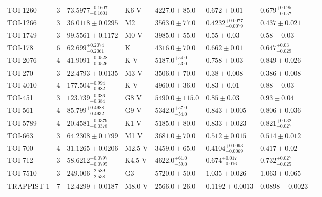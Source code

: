 \begin{tabular}{lrllllll}
TOI-1260 & 3 & $73.5977^{+0.1607}_{-0.1601}$ & K6 V & $4227.0 \pm 85.0$ & $0.672 \pm 0.01$ & $0.679^{+0.095}_{-0.057}$ & \cite{LAM_ET_AL_2023} \\
TOI-1266 & 3 & $36.0118 \pm 0.0295$ & M2 & $3563.0 \pm 77.0$ & $0.4232^{+0.0077}_{-0.0079}$ & $0.437 \pm 0.021$ & \cite{GREKLEK_MCKEON_ET_AL_2025} \\
TOI-1749 & 3 & $99.5561 \pm 0.1172$ & M0 V & $3985.0 \pm 55.0$ & $0.55 \pm 0.03$ & $0.58 \pm 0.03$ & \cite{FUKUI_ET_AL__2021} \\
TOI-178 & 6 & $62.699^{+0.2074}_{-0.2061}$ & K & $4316.0 \pm 70.0$ & $0.662 \pm 0.01$ & $0.647^{+0.03}_{-0.029}$ & \cite{LELEU_ET_AL__2024} \\
TOI-2076 & 4 & $41.9091^{+0.0528}_{-0.0526}$ & K V & $5187.0^{+54.0}_{-53.0}$ & $0.758 \pm 0.03$ & $0.849 \pm 0.026$ & \cite{KOKORI_ET_AL__2023} \\
TOI-270 & 3 & $22.4793 \pm 0.0135$ & M3 V & $3506.0 \pm 70.0$ & $0.38 \pm 0.008$ & $0.386 \pm 0.008$ & \cite{KAYE_ET_AL__2022} \\
TOI-4010 & 4 & $177.504^{+0.994}_{-0.982}$ & K V & $4960.0 \pm 36.0$ & $0.83 \pm 0.01$ & $0.88 \pm 0.03$ & \cite{KUNIMOTO_ET_AL__2023} \\
TOI-451 & 3 & $123.739^{+0.386}_{-0.384}$ & G8 V & $5490.0 \pm 115.0$ & $0.85 \pm 0.03$ & $0.93 \pm 0.04$ & \cite{BARRAGAN_ET_AL_2026} \\
TOI-561 & 4 & $85.799^{+0.4988}_{-0.4932}$ & G9 V & $5342.0^{+57.0}_{-54.0}$ & $0.843 \pm 0.005$ & $0.806 \pm 0.036$ & \cite{POLANSKI_ET_AL__2024} \\
TOI-5789 & 4 & $20.4581^{+0.0379}_{-0.0378}$ & K1 V & $5185.0 \pm 80.0$ & $0.833 \pm 0.023$ & $0.821^{+0.032}_{-0.027}$ & \cite{BONOMO_ET_AL_2026} \\
TOI-663 & 3 & $64.2308 \pm 0.1799$ & M1 V & $3681.0 \pm 70.0$ & $0.512 \pm 0.015$ & $0.514 \pm 0.012$ & \cite{COINTEPAS_ET_AL__2024} \\
TOI-700 & 4 & $31.1265 \pm 0.0206$ & M2.5 V & $3459.0 \pm 65.0$ & $0.4104^{+0.0093}_{-0.0069}$ & $0.417 \pm 0.02$ & \cite{GILBERT_ET_AL_2023} \\
TOI-712 & 3 & $58.6212^{+0.0797}_{-0.0795}$ & K4.5 V & $4622.0^{+61.0}_{-59.0}$ & $0.674^{+0.017}_{-0.016}$ & $0.732^{+0.027}_{-0.025}$ & \cite{VACH_ET_AL__2022} \\
TOI-7510 & 3 & $249.006^{+2.589}_{-2.538}$ & G3 & $5720.0 \pm 50.0$ & $1.035 \pm 0.026$ & $1.063 \pm 0.065$ & \cite{ALMENARA_ET_AL_2025} \\
TRAPPIST-1 & 7 & $12.4299 \pm 0.0187$ & M8.0 V & $2566.0 \pm 26.0$ & $0.1192 \pm 0.0013$ & $0.0898 \pm 0.0023$ & \cite{AGOL_ET_AL__2021} \\

\end{tabular}
